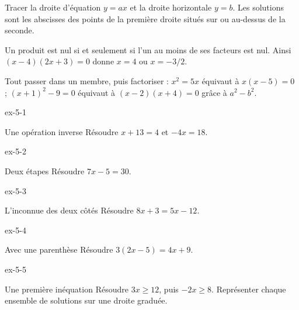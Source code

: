 \begin{savoirfaire}Tracer la droite d’équation $y=ax$ et la droite horizontale $y=b$. Les solutions sont les abscisses des points de la première droite situés sur ou au-dessus de la seconde.\end{savoirfaire}
\begin{propriete}Un produit est nul si et seulement si l’un au moins de ses facteurs est nul. Ainsi $(x-4)(2x+3)=0$ donne $x=4$ ou $x=-3/2$.\end{propriete}
\begin{savoirfaire}Tout passer dans un membre, puis factoriser : $x^2=5x$ équivaut à $x(x-5)=0$ ; $(x+1)^2-9=0$ équivaut à $(x-2)(x+4)=0$ grâce à $a^2-b^2$.\end{savoirfaire}
\clearpage{}
\begin{blocLivre}{ex-5-1}\begin{exercice}[1]{Une opération inverse}
Résoudre $x+13=4$ et $-4x=18$.
\end{exercice}\end{blocLivre}
\begin{blocLivre}{ex-5-2}\begin{exercice}[1]{Deux étapes}
Résoudre $7x-5=30$.
\end{exercice}\end{blocLivre}
\begin{blocLivre}{ex-5-3}\begin{exercice}[1]{L’inconnue des deux côtés}
Résoudre $8x+3=5x-12$.
\end{exercice}\end{blocLivre}
\begin{blocLivre}{ex-5-4}\begin{exercice}[1]{Avec une parenthèse}
Résoudre $3(2x-5)=4x+9$.
\end{exercice}\end{blocLivre}
\begin{blocLivre}{ex-5-5}\begin{exercice}[1]{Une première inéquation}
Résoudre $3x\ge12$, puis $-2x\ge8$. Représenter chaque ensemble de solutions sur une droite graduée.
\label{fig-ex-5-5}
\end{exercice}\end{blocLivre}

